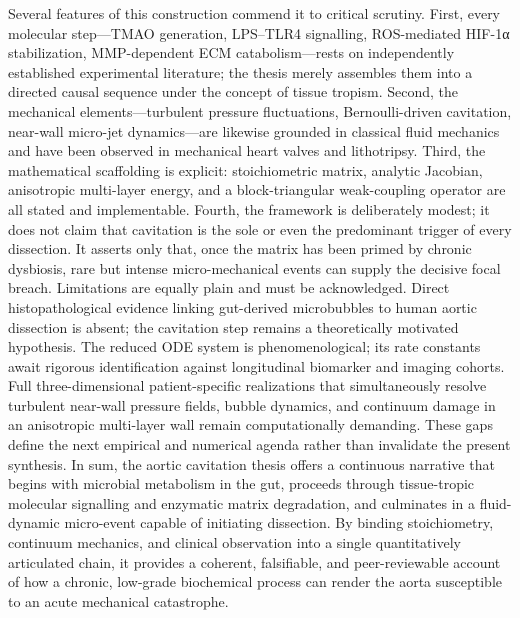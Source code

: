 Several features of this construction commend it to critical scrutiny. First, every molecular step—TMAO generation, LPS–TLR4 signalling, ROS-mediated HIF-1α stabilization, MMP-dependent ECM catabolism—rests on independently established experimental literature; the thesis merely assembles them into a directed causal sequence under the concept of tissue tropism. Second, the mechanical elements—turbulent pressure fluctuations, Bernoulli-driven cavitation, near-wall micro-jet dynamics—are likewise grounded in classical fluid mechanics and have been observed in mechanical heart valves and lithotripsy. Third, the mathematical scaffolding is explicit: stoichiometric matrix, analytic Jacobian, anisotropic multi-layer energy, and a block-triangular weak-coupling operator are all stated and implementable. Fourth, the framework is deliberately modest; it does not claim that cavitation is the sole or even the predominant trigger of every dissection. It asserts only that, once the matrix has been primed by chronic dysbiosis, rare but intense micro-mechanical events can supply the decisive focal breach.
Limitations are equally plain and must be acknowledged. Direct histopathological evidence linking gut-derived microbubbles to human aortic dissection is absent; the cavitation step remains a theoretically motivated hypothesis. The reduced ODE system is phenomenological; its rate constants await rigorous identification against longitudinal biomarker and imaging cohorts. Full three-dimensional patient-specific realizations that simultaneously resolve turbulent near-wall pressure fields, bubble dynamics, and continuum damage in an anisotropic multi-layer wall remain computationally demanding. These gaps define the next empirical and numerical agenda rather than invalidate the present synthesis.
In sum, the aortic cavitation thesis offers a continuous narrative that begins with microbial metabolism in the gut, proceeds through tissue-tropic molecular signalling and enzymatic matrix degradation, and culminates in a fluid-dynamic micro-event capable of initiating dissection. By binding stoichiometry, continuum mechanics, and clinical observation into a single quantitatively articulated chain, it provides a coherent, falsifiable, and peer-reviewable account of how a chronic, low-grade biochemical process can render the aorta susceptible to an acute mechanical catastrophe.
